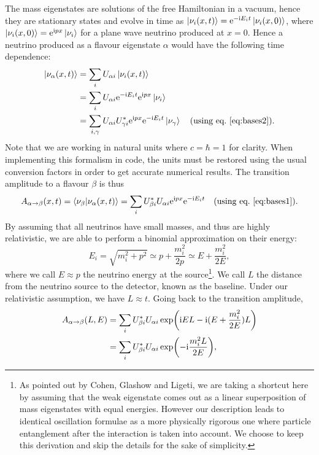 The mass eigenstates are solutions of the free Hamiltonian in a vacuum, hence
they are stationary states and evolve in time as $\ket{\nu_i(x,
t)} = \mathrm{e}^{-\mathrm{i} E_i t} \ket{\nu_i(x, 0)}$, where $\ket{\nu_i(x, 0)} = \mathrm{e}^{\mathrm{i} p
x} \ket{\nu_i}$ for a plane wave neutrino produced at $x=0$.
Hence a neutrino produced as a flavour eigenstate $\alpha$ would have the
following time dependence:
\begin{align*}
\ket{\nu_\alpha(x, t)} &= \sum_i U_{\alpha i} \ket{\nu_i(x, t)} \\
		&= \sum_i U_{\alpha i} \mathrm{e}^{-\mathrm{i} E_i t} \mathrm{e}^{\mathrm{i} p x} \ket{\nu_i}\\
		&= \sum_{i, \gamma} U_{\alpha i} U^*_{\gamma i} \mathrm{e}^{\mathrm{i} p x}
				\mathrm{e}^{-\mathrm{i} E_i t} \ket{\nu_\gamma}\quad\text{(using eq.~\ref{eq:bases2})}.
\end{align*}
Note that we are working in natural units where $c=\hbar=1$ for clarity. When
implementing this formalism in code, the units must be restored using
the usual conversion factors in order to get accurate numerical results.
The transition amplitude to a flavour $\beta$ is thus 
\begin{align}
	A_{\alpha \rightarrow \beta}(x, t) = \bra{\nu_\beta}\ket{\nu_\alpha(x, t)} \nonumber
			= \sum_i U^*_{\beta i} U_{\alpha i} \mathrm{e}^{\mathrm{i} p x}
			\mathrm{e}^{-\mathrm{i} E_i t}\quad\text{(using eq.~\ref{eq:bases1})}.
\end{align}
By assuming that all neutrinos have small masses, and thus are highly
relativistic, we are able to perform a binomial approximation on their
energy: 
\begin{equation} E_i = \sqrt{m_i^2 + p^2} \simeq p + \frac{m_i^2}{2 p} \simeq E +
\frac{m_i^2}{2E},\label{eq:binomial}\end{equation}
where we call $E \approx p$ the neutrino energy at the source\footnote{As
pointed out by Cohen, Glashow and Ligeti\cite{cohen}, we are taking a shortcut
here by assuming that the weak eigenstate comes out as a linear superposition
of mass eigenstates with equal energies. However our description leads to
identical oscillation formulae as a more physically rigorous one where particle
entanglement after the interaction is taken into account. We choose to keep
this derivation and skip the details for the sake of simplicity.}. We call $L$
the distance from the neutrino source to the detector, known as the baseline.
Under our relativistic assumption, we have $L \approx t$. Going back to the
transition amplitude,
\begin{align*}
	A_{\alpha \rightarrow \beta}(L, E) &= \sum_i U^*_{\beta i} U_{\alpha i}
	\exp(\mathrm{i} E L - \mathrm{i}(E + \frac{m_i^2}{2 E}) L)\\
	&= \sum_i U^*_{\beta i} U_{\alpha i} \exp(-\mathrm{i} \frac{m_i^2 L}{2E}),
\end{align*}

